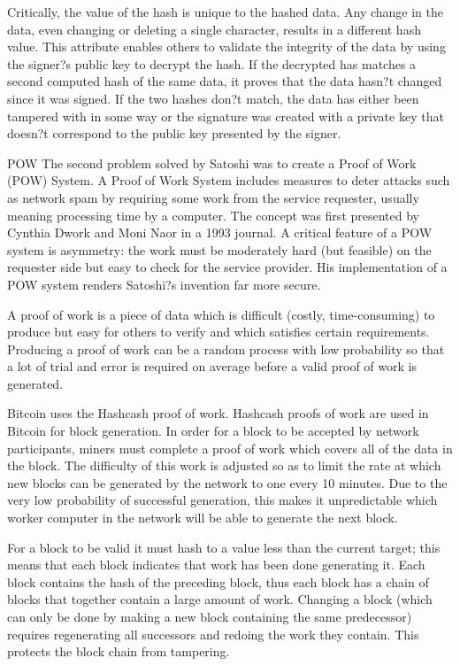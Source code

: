\documentclass[11pt, oneside]{article}   	%
\begin{document}
		\par
	Critically, the value of the hash is unique to the hashed data. Any change in the data, even changing or deleting a single character, results in a different hash value. This attribute enables others to validate the integrity of the data by using the signer?s public key to decrypt the hash. If the decrypted has matches a second computed hash of the same data, it proves that the data hasn?t changed since it was signed. If the two hashes don?t match, the data has either been tampered with in some way or the signature was created with a private key that doesn?t correspond to the public key presented by the signer. 
		\par
	POW	The second problem solved by Satoshi was to create a Proof of Work (POW) System. A Proof of Work System includes measures to deter attacks such as network spam by requiring some work from the service requester, usually meaning processing time by a computer. The concept was first presented by Cynthia Dwork and Moni Naor in a 1993 journal. A critical feature of a POW system is asymmetry: the work must be moderately hard (but feasible) on the requester side but easy to check for the service provider. His implementation of a POW system renders Satoshi?s invention far more secure. 
		\par
	A proof of work is a piece of data which is difficult (costly, time-consuming) to produce but easy for others to verify and which satisfies certain requirements. Producing a proof of work can be a random process with low probability so that a lot of trial and error is required on average before a valid proof of work is generated. 
		\par
	Bitcoin uses the Hashcash proof of work. Hashcash proofs of work are used in Bitcoin for block generation. In order for a block to be accepted by network participants, miners must complete a proof of work which covers all of the data in the block. The difficulty of this work is adjusted so as to limit the rate at which new blocks can be generated by the network to one every 10 minutes. Due to the very low probability of successful generation, this makes it unpredictable which worker computer in the network will be able to generate the next block.
		\par
	For a block to be valid it must hash to a value less than the current target; this means that each block indicates that work has been done generating it. Each block contains the hash of the preceding block, thus each block has a chain of blocks that together contain a large amount of work. Changing a block (which can only be done by making a new block containing the same predecessor) requires regenerating all successors and redoing the work they contain. This protects the block chain from tampering.
		\par
\end{document}
